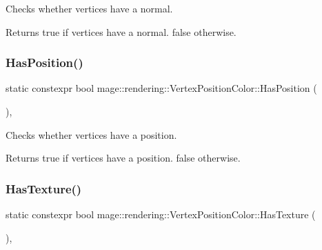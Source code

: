 Checks whether vertices have a normal.

\begin{DoxyReturn}{Returns}
{\ttfamily true} if vertices have a normal. {\ttfamily false} otherwise. 
\end{DoxyReturn}
\mbox{\label{structmage_1_1rendering_1_1_vertex_position_color_a9a905a75c75030b37575a7b65dff61b0}} 
\subsubsection{\texorpdfstring{Has\+Position()}{HasPosition()}}
{\footnotesize\ttfamily static constexpr bool mage\+::rendering\+::\+Vertex\+Position\+Color\+::\+Has\+Position (\begin{DoxyParamCaption}{ }\end{DoxyParamCaption})\hspace{0.3cm}{\ttfamily [static]}, {\ttfamily [noexcept]}}

Checks whether vertices have a position.

\begin{DoxyReturn}{Returns}
{\ttfamily true} if vertices have a position. {\ttfamily false} otherwise. 
\end{DoxyReturn}
\mbox{\label{structmage_1_1rendering_1_1_vertex_position_color_a1498641d42122251a8612b7b40d171da}} 
\subsubsection{\texorpdfstring{Has\+Texture()}{HasTexture()}}
{\footnotesize\ttfamily static constexpr bool mage\+::rendering\+::\+Vertex\+Position\+Color\+::\+Has\+Texture (\begin{DoxyParamCaption}{ }\end{DoxyParamCaption})\hspace{0.3cm}{\ttfamily [static]}, {\ttfamily [noexcept]}}

